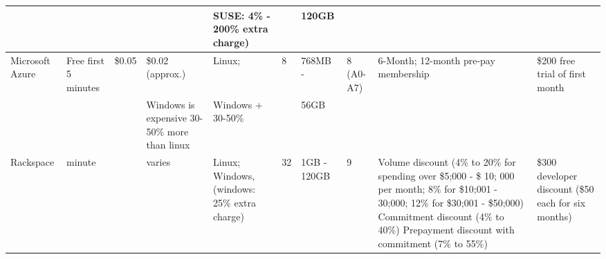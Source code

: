 \documentclass{sig-alternate}
\begin{document}
\begin{table}
\begin{small}
\begin{tabular}{|p{2cm}|p{2cm}|p{1.5cm}|p{1.5cm}|p{2cm}|p{1cm}|p{1.5cm}|p{2cm}|p{2cm}|p{2cm}|}
 &  &  &  & SUSE: 4\% - 200\% extra charge) &  & 120GB &  &  & \\
\hline 
Microsoft Azure & Free first 5 minutes & \$0.05  & \$0.02 (approx.) & Linux;  & 8 & 768MB -  & 8 (A0-A7) & 6-Month; 12-month pre-pay membership & \$200 free trial of first month\\
 &  &  & Windows is expensive 30-50\% more than linux & Windows + 30-50\%  &  & 56GB &  &  & \\
\hline 
Rackspace & minute &  & varies & Linux; Windows, (windows: 25\% extra charge) & 32 & 1GB - 120GB  & 9 & Volume discount (4\% to 20\% for spending over \$5;000 - \$ 10; 000 per month; 8\% for \$10;001 - 30;000; 12\% for \$30;001 - \$50;000) Commitment discount (4\% to 40\%) Prepayment discount with commitment (7\% to 55\%)& \$300 developer discount (\$50 each for six months)\\
\hline
\end{tabular}
\end{small}
\end{table}


% 
\end{document}
